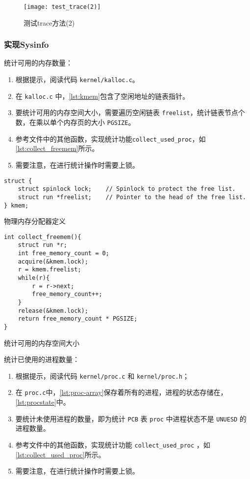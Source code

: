 \begin{figure}[!htb]
	\centering
	\texttt{[image: test\_trace(2)]}
	\caption{测试trace方法(2)}
	\label{fig:test_trace(2)}
\end{figure}

\subsubsection{实现Sysinfo}

统计可用的内存数量：

\begin{enumerate}
	\item 根据提示，阅读代码 \texttt{kernel/kalloc.c}。
	\item 在 \texttt{kalloc.c} 中，\cref{lst:kmem}包含了空闲地址的链表指针。
	\item 要统计可用的内存空间大小，需要遍历空闲链表 \texttt{freelist}，统计链表节点个数，在乘以单个内存页的大小 \texttt{PGSIZE}。
	\item 参考文件中的其他函数，实现统计功能\texttt{collect\_used\_proc}，如\cref{lst:collect_freemem}所示。
	\item 需要注意，在进行统计操作时需要上锁。
\end{enumerate}

\begin{listing}[!htb]
	\begin{verbatim}
struct {
	struct spinlock lock;    // Spinlock to protect the free list.
	struct run *freelist;    // Pointer to the head of the free list.
} kmem;
	\end{verbatim}
	\caption{物理内存分配器定义}\label{lst:kmem}
\end{listing}

\begin{listing}[!htb]
	\begin{verbatim}
int collect_freemem(){
    struct run *r;
    int free_memory_count = 0;
    acquire(&kmem.lock);
    r = kmem.freelist;
    while(r){
        r = r->next;
        free_memory_count++;
    }
    release(&kmem.lock);
    return free_memory_count * PGSIZE;
}
	\end{verbatim}
	\caption{统计可用的内存空间大小}\label{lst:collect_freemem}
\end{listing}

统计已使用的进程数量：

\begin{enumerate}
	\item 根据提示，阅读代码 \texttt{kernel/proc.c} 和 \texttt{kernel/proc.h}；
	\item 在 \texttt{proc.c}中，\cref{lst:proc-array}保存着所有的进程，进程的状态存储在，\cref{lst:procstate}中。
	\item 要统计未使用进程的数量，即为统计 \texttt{PCB} 表 \texttt{proc} 中进程状态不是 \texttt{UNUESD} 的进程数量。
	\item 参考文件中的其他函数，实现统计功能 \texttt{collect\_used\_proc} ，如\cref{lst:collect_used_proc}所示。
	\item 需要注意，在进行统计操作时需要上锁。
\end{enumerate}

